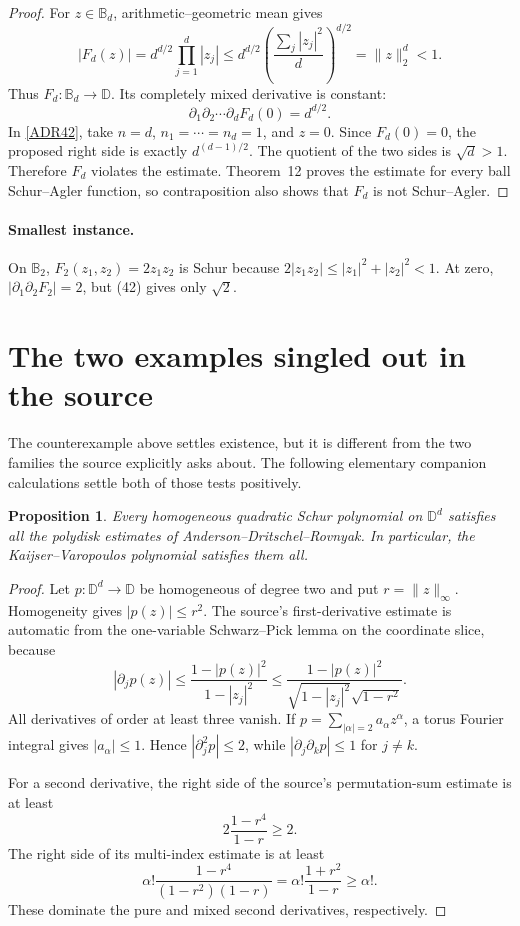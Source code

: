 \documentclass[11pt]{article}
\newtheorem*{proposition}{Proposition}
\newcommand{\D}{\mathbb D}
\newcommand{\B}{\mathbb B}
\begin{document}
\begin{proof}
For $z\in\B_d$, arithmetic--geometric mean gives
\[
 |F_d(z)|
 =d^{d/2}\prod_{j=1}^d |z_j|
 \le d^{d/2}\left(\frac{\sum_j|z_j|^2}{d}\right)^{d/2}
 =\|z\|_2^d<1.
\]
Thus $F_d:\B_d\to\D$.  Its completely mixed derivative is constant:
\[
 \partial_1\partial_2\cdots\partial_dF_d(0)=d^{d/2}.
\]
In \eqref{ADR42}, take $n=d$, $n_1=\cdots=n_d=1$, and $z=0$.
Since $F_d(0)=0$, the proposed right side is exactly
$d^{(d-1)/2}$.  The quotient of the two sides is $\sqrt d>1$.
Therefore $F_d$ violates the estimate.  Theorem~12 proves the estimate for
every ball Schur--Agler function, so contraposition also shows that $F_d$ is
not Schur--Agler.
\end{proof}

\paragraph{Smallest instance.}
On $\B_2$, $F_2(z_1,z_2)=2z_1z_2$ is Schur because
$2|z_1z_2|\le |z_1|^2+|z_2|^2<1$.  At zero,
$|\partial_1\partial_2F_2|=2$, but (42) gives only $\sqrt2$.

\section*{The two examples singled out in the source}

The counterexample above settles existence, but it is different from the two
families the source explicitly asks about.  The following elementary companion
calculations settle both of those tests positively.

\begin{proposition}
Every homogeneous quadratic Schur polynomial on $\D^d$ satisfies all the
polydisk estimates of Anderson--Dritschel--Rovnyak.  In particular, the
Kaijser--Varopoulos polynomial satisfies them all.
\end{proposition}

\begin{proof}
Let $p:\D^d\to\D$ be homogeneous of degree two and put
$r=\|z\|_\infty$.  Homogeneity gives $|p(z)|\le r^2$.  The source's
first-derivative estimate is automatic from the one-variable Schwarz--Pick
lemma on the coordinate slice, because
\[
 |\partial_jp(z)|\le\frac{1-|p(z)|^2}{1-|z_j|^2}
 \le\frac{1-|p(z)|^2}
 {\sqrt{1-|z_j|^2}\sqrt{1-r^2}}.
\]
All derivatives of order at least three vanish.  If
$p=\sum_{|\alpha|=2}a_\alpha z^\alpha$, a torus Fourier integral gives
$|a_\alpha|\le1$.  Hence $|\partial_j^2p|\le2$, while
$|\partial_j\partial_kp|\le1$ for $j\ne k$.

For a second derivative, the right side of the source's permutation-sum
estimate is at least
\[
 2\frac{1-r^4}{1-r}\ge2.
\]
The right side of its multi-index estimate is at least
\[
 \alpha!\frac{1-r^4}{(1-r^2)(1-r)}
 =\alpha!\frac{1+r^2}{1-r}\ge\alpha!.
\]
These dominate the pure and mixed second derivatives, respectively.
\end{proof}
\end{document}
